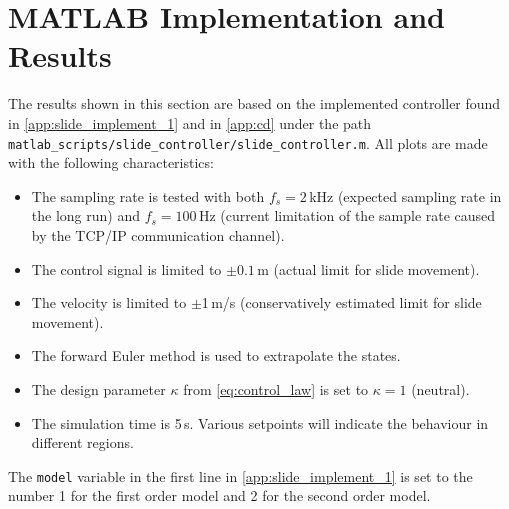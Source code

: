 \vspace{-0.3cm}
\section{MATLAB Implementation and Results}\label{sec:matlab-results-slide-safety}
\vspace{-0.2cm}
The results shown in this section are based on the implemented controller found in \autoref{app:slide_implement_1} and in \autoref{app:cd} under the path \texttt{matlab\_scripts/slide\_controller/slide\_controller.m}. All plots are made with the following characteristics:
\vspace{-1mm}
\begin{itemize}
	\itemsep-0.7mm
\item The sampling rate is tested with both $f_s = 2\,$kHz (expected sampling rate in the long run) and $f_s = 100\,$Hz (current limitation of the sample rate caused by the TCP/IP communication channel).
\item The control signal is limited to $\pm 0.1$\,m (actual limit for slide movement).
\item The velocity is limited to $\pm$1\,m/s (conservatively estimated limit for slide movement).
\item The forward Euler method is used to extrapolate the states.
\item The design parameter $\kappa$ from \autoref{eq:control_law} is set to $\kappa=1$ (neutral).
\item The simulation time is 5\,s. Various setpoints will indicate the behaviour in different regions.
\end{itemize}
The \texttt{model} variable in the first line in \autoref{app:slide_implement_1} is set to the number 1 for the first order model and 2 for the second order model. 


